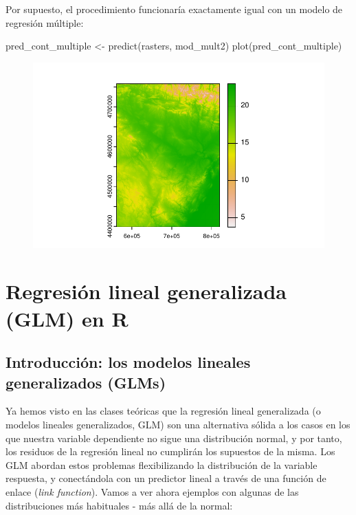 \documentclass[
  letterpaper,
  DIV=11,
  numbers=noendperiod]{scrreprt}
\newenvironment{Shaded}{\begin{snugshade}}{\end{snugshade}}
\newcommand{\FunctionTok}[1]{\textcolor[rgb]{0.28,0.35,0.67}{#1}}
\newcommand{\NormalTok}[1]{\textcolor[rgb]{0.00,0.23,0.31}{#1}}
\newcommand{\OtherTok}[1]{\textcolor[rgb]{0.00,0.23,0.31}{#1}}
\begin{document}
Por supuesto, el procedimiento funcionaría exactamente igual con un
modelo de regresión múltiple:

\begin{Shaded}
\begin{Highlighting}[]
\NormalTok{pred\_cont\_multiple }\OtherTok{\textless{}{-}} \FunctionTok{predict}\NormalTok{(rasters, mod\_mult2)}
\FunctionTok{plot}\NormalTok{(pred\_cont\_multiple)}
\end{Highlighting}
\end{Shaded}

\begin{figure}[H]

{\centering \includegraphics{01_RegresionLineal_files/figure-pdf/unnamed-chunk-42-1.pdf}

}

\end{figure}

\hypertarget{sec-GLM}{%
\chapter{Regresión lineal generalizada (GLM) en R}\label{sec-GLM}}

\hypertarget{introducciuxf3n-los-modelos-lineales-generalizados-glms}{%
\section{Introducción: los modelos lineales generalizados
(GLMs)}\label{introducciuxf3n-los-modelos-lineales-generalizados-glms}}

Ya hemos visto en las clases teóricas que la regresión lineal
generalizada (o modelos lineales generalizados, GLM) son una alternativa
sólida a los casos en los que nuestra variable dependiente no sigue una
distribución normal, y por tanto, los residuos de la regresión lineal no
cumplirán los supuestos de la misma. Los GLM abordan estos problemas
flexibilizando la distribución de la variable respuesta, y conectándola
con un predictor lineal a través de una función de enlace (\emph{link
function}). Vamos a ver ahora ejemplos con algunas de las distribuciones
más habituales - más allá de la normal:
\end{document}
